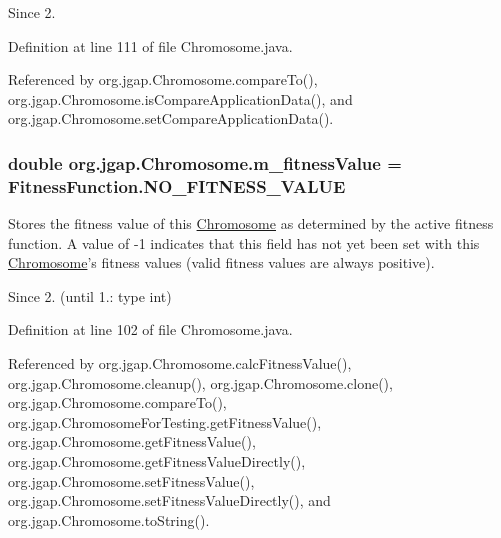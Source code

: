 \begin{DoxySince}{Since}
2. 
\end{DoxySince}


Definition at line 111 of file Chromosome.\-java.



Referenced by org.\-jgap.\-Chromosome.\-compare\-To(), org.\-jgap.\-Chromosome.\-is\-Compare\-Application\-Data(), and org.\-jgap.\-Chromosome.\-set\-Compare\-Application\-Data().

\hypertarget{classorg_1_1jgap_1_1_chromosome_a905236819a9904ca3d096fa1c325aa1b}{
\subsubsection[{m\-\_\-fitness\-Value}]{\setlength{\rightskip}{0pt plus 5cm}double org.\-jgap.\-Chromosome.\-m\-\_\-fitness\-Value = {\bf Fitness\-Function.\-N\-O\-\_\-\-F\-I\-T\-N\-E\-S\-S\-\_\-\-V\-A\-L\-U\-E}\hspace{0.3cm}{\ttfamily [protected]}}}\label{classorg_1_1jgap_1_1_chromosome_a905236819a9904ca3d096fa1c325aa1b}
Stores the fitness value of this \hyperlink{classorg_1_1jgap_1_1_chromosome}{Chromosome} as determined by the active fitness function. A value of -\/1 indicates that this field has not yet been set with this \hyperlink{classorg_1_1jgap_1_1_chromosome}{Chromosome}'s fitness values (valid fitness values are always positive).

\begin{DoxySince}{Since}
2. (until 1.\-: type int) 
\end{DoxySince}


Definition at line 102 of file Chromosome.\-java.



Referenced by org.\-jgap.\-Chromosome.\-calc\-Fitness\-Value(), org.\-jgap.\-Chromosome.\-cleanup(), org.\-jgap.\-Chromosome.\-clone(), org.\-jgap.\-Chromosome.\-compare\-To(), org.\-jgap.\-Chromosome\-For\-Testing.\-get\-Fitness\-Value(), org.\-jgap.\-Chromosome.\-get\-Fitness\-Value(), org.\-jgap.\-Chromosome.\-get\-Fitness\-Value\-Directly(), org.\-jgap.\-Chromosome.\-set\-Fitness\-Value(), org.\-jgap.\-Chromosome.\-set\-Fitness\-Value\-Directly(), and org.\-jgap.\-Chromosome.\-to\-String().

